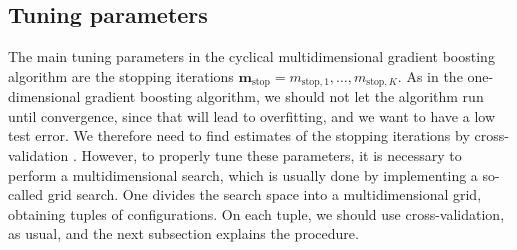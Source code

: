 \subsection{Tuning parameters}
The main tuning parameters in the cyclical multidimensional gradient boosting algorithm are the stopping iterations $\boldsymbol{m}_{\text{stop}}=m_{\text{stop},1},\ldots,m_{\text{stop},K}$.
As in the one-dimensional gradient boosting algorithm, we should not let the algorithm run until convergence, since that will lead to overfitting, and we want to have a low test error.
We therefore need to find estimates of the stopping iterations by cross-validation \citep{schmid}.
However, to properly tune these parameters, it is necessary to perform a multidimensional search, which is usually done by implementing a so-called grid search.
One divides the search space into a multidimensional grid, obtaining tuples of configurations.
On each tuple, we should use cross-validation, as usual, and the next subsection explains the procedure.
